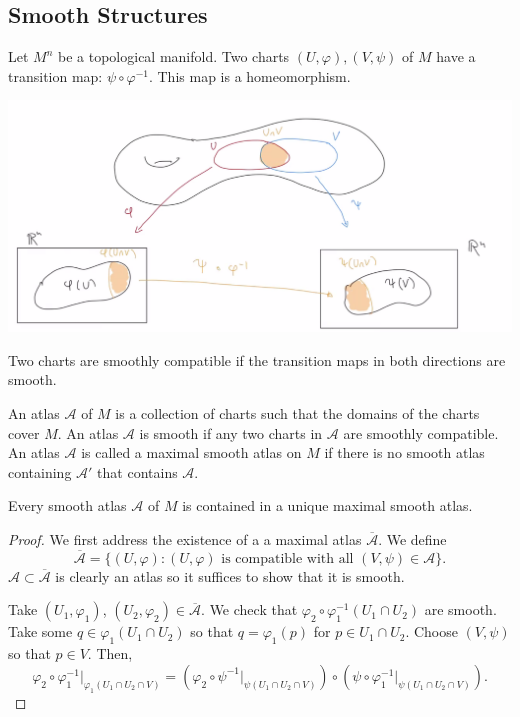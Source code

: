\documentclass[12pt]{scrartcl}
\let \phi \varphi
\let \mc \mathcal
\let \ol \overline
\begin{document}
\subsection{Smooth Structures}
\begin{definition} Let $M^n$ be a topological manifold.  Two charts $(U, \phi), (V, \psi)$ of $M$ have a transition map: $\psi \circ \phi^{-1}$.  This map is a homeomorphism.
\end{definition}
\includegraphics[scale=0.5]{transition}
\begin{definition} Two charts are smoothly compatible if the transition maps in both directions are smooth.
\end{definition}
\begin{definition} An atlas $\mc A$ of $M$ is a collection of charts such that the domains of the charts cover $M$.  An atlas $\mc A$ is smooth if any two charts in $\mc A$ are smoothly compatible.  An atlas $\mc A$ is called a maximal smooth atlas on $M$ if there is no smooth atlas containing $\mc A'$ that contains $\mc A$.  
\end{definition}
\begin{theorem}
Every smooth atlas $\mc A$ of $M$ is contained in a unique maximal smooth atlas.  
\end{theorem}
\begin{proof}
We first address the existence of a a maximal atlas $\ol{\mc A}$.  We define 
$$\ol{\mc A} = \{(U, \phi) : (U, \phi) \text{ is compatible with all } (V, \psi) \in \mc A \}.$$
$\mc A \subset \ol{\mc A}$ is clearly an atlas so it suffices to show that it is smooth.  

Take $(U_1, \phi_1)$, $(U_2, \phi_2) \in \ol{\mc A}$.  We check that $\phi_2 \circ \phi_1^{-1}(U_1 \cap U_2)$ are smooth.   Take some $q \in \phi_1(U_1 \cap U_2)$ so that $q = \phi_1(p)$ for $p \in U_1 \cap U_2$.  Choose $(V, \psi)$ so that $p \in V$.  Then,
 $$\phi_2 \circ \phi_1^{-1} \vert_{\phi_1(U_1 \cap U_2 \cap V)} = (\phi_2 \circ \psi^{-1}\vert_{\psi(U_1 \cap U_2 \cap V)}) \circ (\psi \circ \phi_1^{-1}\vert_{\psi(U_1 \cap U_2 \cap V)}).$$
\end{proof}
\end{document}
